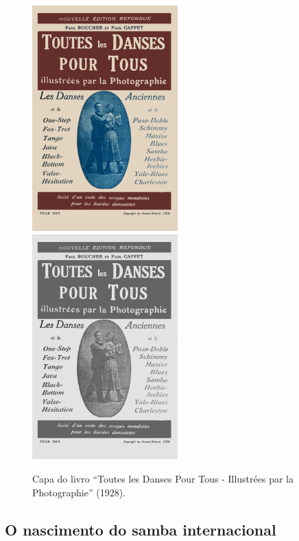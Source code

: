   \begin{figure}[h!]
    \centering
    \ifx\EnableGrayScale\undefined
    \includegraphics[width=0.5\textwidth]{chapters/cap-historia-sambagafieira/Toutes-les-danses-pour-tous.png}
    \else
    \includegraphics[width=0.5\textwidth]{chapters/cap-historia-sambagafieira/Toutes-les-danses-pour-tous-HSV.png}
    \fi
    \caption{Capa do livro ``Toutes les Danses Pour Tous - Illustrées par la Photographie'' (1928).}
    \label{fig:LivroPaulBoucher}
  \end{figure}


\subsection{O nascimento do samba internacional}


